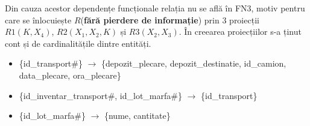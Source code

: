 \documentclass[12pt, a4paper]{article}
\begin{document}
Din cauza acestor dependențe funcționale relația nu se află în FN3, motiv pentru care se înlocuiește $R$(\textbf{fără pierdere de informație}) prin 3 proiecții $R1(K, X_4)$, $R2(X_1, X_2, K)$ și $R3(X_2, X_3)$. În creearea proiecțiilor s-a ținut cont și de cardinalitățile dintre entități.

\begin{itemize}
    \item \{id\_transport\#\} $\rightarrow$ \{depozit\_plecare, depozit\_destinatie, id\_camion, \\data\_plecare, ora\_plecare\}
    \item \{id\_inventar\_transport\#, id\_lot\_marfa\#\} $\rightarrow$ \{id\_transport\}
    \item \{id\_lot\_marfa\#\} $\rightarrow$ \{nume, cantitate\}
\end{itemize}

\begin{table}[!htbp]
\begin{center}
\caption{Proiectia \emph{R1-1(K, $X_4$)}}\label{tab11-1}
\end{center}
\end{table}

\begin{table}[!htbp]
\begin{center}
\caption{Proiectia \emph{R1-2($X_1$, $X_2$, K)}}\label{tab11-2}
\end{center}
\end{table}
\end{document}

